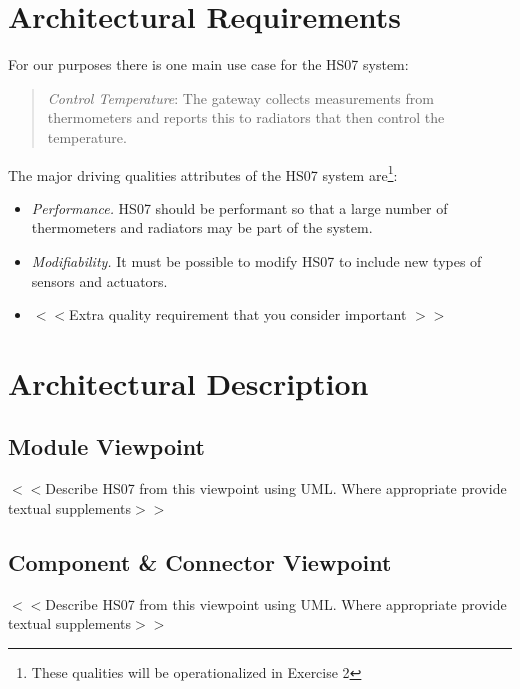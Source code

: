 \documentclass[a4paper,10pt]{article}
\begin{document}
\section{Architectural Requirements}

For our purposes there is one main use case for the HS07 system:
\begin{quote}
  \emph{Control Temperature}: The gateway collects measurements from
  thermometers and reports this to radiators that then control the
  temperature.
\end{quote}

The major driving qualities attributes of the HS07 system
are\footnote{These qualities will be operationalized in Exercise 2}:

\begin{itemize}
\item \emph{Performance.} HS07 should be performant so that a large
  number of thermometers and radiators may be part of the system.
\item \emph{Modifiability.} It must be possible to modify HS07 to
  include new types of sensors and actuators.
  \item $<<$Extra quality requirement that you consider important $>>$
\end{itemize}


\section{Architectural Description}


\subsection{Module Viewpoint}

$<<$Describe HS07 from this viewpoint using UML. Where appropriate
provide textual supplements$>>$

\subsection{Component \& Connector Viewpoint}

$<<$Describe HS07 from this viewpoint using UML. Where appropriate
provide textual supplements$>>$

\end{document}
